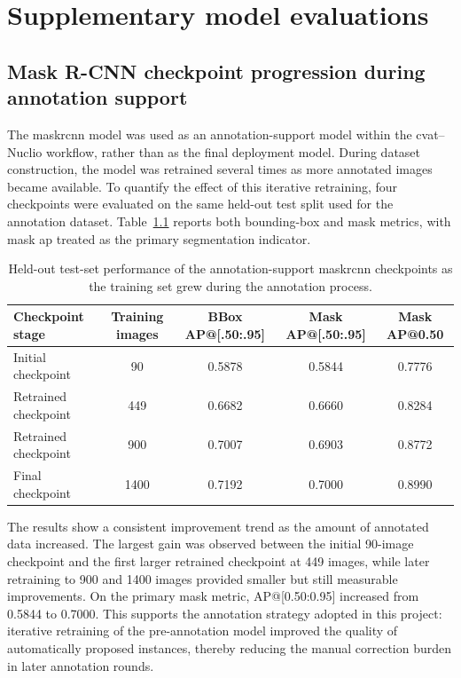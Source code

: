 \chapter{Supplementary model evaluations}
\label{app:maskrcnn_checkpoints}

\section{Mask R-CNN checkpoint progression during annotation support}

The \gls{maskrcnn} model was used as an annotation-support model within the
\gls{cvat}--Nuclio workflow, rather than as the final deployment model. During
dataset construction, the model was retrained several times as more annotated
images became available. To quantify the effect of this iterative retraining, four
checkpoints were evaluated on the same held-out test split used for the
annotation dataset. Table~\ref{tab:maskrcnn_checkpoint_progression} reports both
bounding-box and mask metrics, with mask \gls{ap} treated as the primary
segmentation indicator.

\begin{table}[htbp]
    \centering
    \caption{Held-out test-set performance of the annotation-support \gls{maskrcnn}
    checkpoints as the training set grew during the annotation process.}
    \label{tab:maskrcnn_checkpoint_progression}
    \begin{tabular}{lcccc}
        \toprule
        Checkpoint stage & Training images & BBox AP@[.50:.95] & Mask AP@[.50:.95] & Mask AP@0.50 \\
        \midrule
        Initial checkpoint & 90 & 0.5878 & 0.5844 & 0.7776 \\
        Retrained checkpoint & 449 & 0.6682 & 0.6660 & 0.8284 \\
        Retrained checkpoint & 900 & 0.7007 & 0.6903 & 0.8772 \\
        Final checkpoint & 1400 & 0.7192 & 0.7000 & 0.8990 \\
        \bottomrule
    \end{tabular}
\end{table}

The results show a consistent improvement trend as the amount of annotated data
increased. The largest gain was observed between the initial 90-image checkpoint
and the first larger retrained checkpoint at 449 images, while later retraining
to 900 and 1400 images provided smaller but still measurable improvements. On
the primary mask metric, AP@[0.50:0.95] increased from 0.5844 to 0.7000. This
supports the annotation strategy adopted in this project: iterative retraining of
the pre-annotation model improved the quality of automatically proposed
instances, thereby reducing the manual correction burden in later annotation
rounds.


